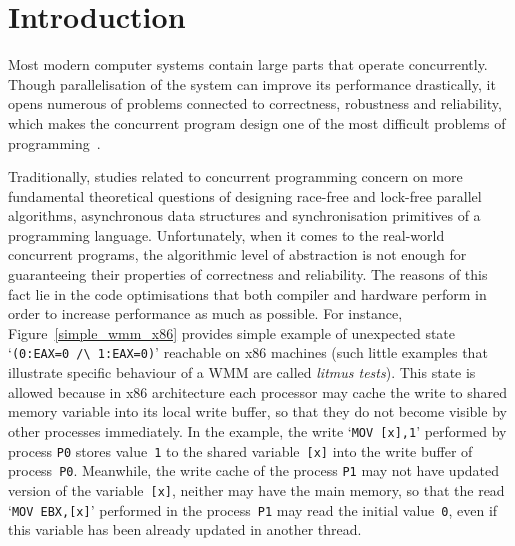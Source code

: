 
\chapter{Introduction}
\label{ch:intro}

Most modern computer systems contain large parts that operate concurrently. Though parallelisation of the system can improve its performance drastically, it opens numerous of problems connected to correctness, robustness and reliability, which makes the concurrent program design one of the most difficult problems of programming~\cite{mckenney2017parallel}.

Traditionally, studies related to concurrent programming concern on more fundamental theoretical questions of designing race-free and lock-free parallel algorithms, asynchronous data structures and synchronisation primitives of a programming language. Unfortunately,
when it comes to 
the real-world concurrent programs, the algorithmic level of abstraction is not enough for guaranteeing their properties of correctness and reliability. The reasons of this fact lie in the code optimisations that both compiler and hardware perform in order to increase performance as much as possible. For instance, Figure~\ref{simple_wmm_x86} provides simple example of
unexpected state `\texttt{(0:EAX=0~/\textbackslash~1:EAX=0)}' reachable on x86 machines (such little examples that illustrate specific behaviour of a WMM are called \textit{litmus tests}).
This state is allowed because in x86 architecture each processor may cache the write to shared memory variable into its local write buffer, so that they do not become visible by other processes immediately. In the example, the write `\texttt{MOV~[x],1}' performed by process \texttt{P0} stores value~\texttt{1} to the shared variable~\texttt{[x]} into the write buffer of process~\texttt{P0}. Meanwhile, the write cache of the process \texttt{P1} may not have updated version of the variable~\texttt{[x]}, neither may have the main memory, so that the read `\texttt{MOV~EBX,[x]}' performed in the process~\texttt{P1} may read the initial value~\texttt{0}, even if this variable has been already updated in another thread.

